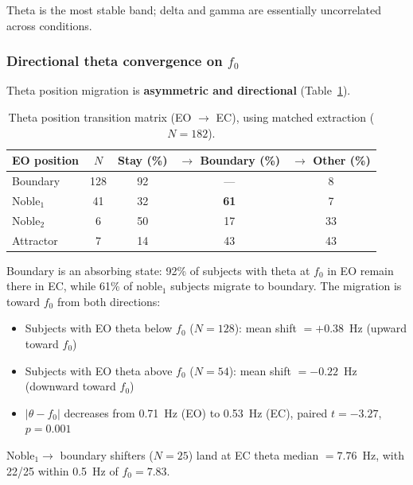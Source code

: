 \documentclass[11pt,a4paper]{article}
\newcommand{\fzero}{f_0}
\begin{document}
Theta is the most stable band; delta and gamma are essentially uncorrelated across conditions.

\subsubsection{Directional theta convergence on $\fzero$}

Theta position migration is \textbf{asymmetric and directional} (Table~\ref{tab:theta_transition}).

\begin{table}[H]
\centering
\caption{Theta position transition matrix (EO $\to$ EC), using matched extraction ($N = 182$).}
\label{tab:theta_transition}
\begin{tabular}{lcccc}
\toprule
EO position & $N$ & Stay (\%) & $\to$ Boundary (\%) & $\to$ Other (\%) \\
\midrule
Boundary & 128 & 92 & --- & 8 \\
Noble$_1$ & 41 & 32 & \textbf{61} & 7 \\
Noble$_2$ & 6 & 50 & 17 & 33 \\
Attractor & 7 & 14 & 43 & 43 \\
\bottomrule
\end{tabular}
\end{table}

Boundary is an absorbing state: 92\% of subjects with theta at $\fzero$ in EO remain there in EC, while 61\% of noble$_1$ subjects migrate to boundary. The migration is toward $\fzero$ from both directions:
\begin{itemize}
    \item Subjects with EO theta below $\fzero$ ($N = 128$): mean shift $= +0.38$~Hz (upward toward $\fzero$)
    \item Subjects with EO theta above $\fzero$ ($N = 54$): mean shift $= -0.22$~Hz (downward toward $\fzero$)
    \item $|\theta - \fzero|$ decreases from 0.71~Hz (EO) to 0.53~Hz (EC), paired $t = -3.27$, $p = 0.001$
\end{itemize}

Noble$_1 \to$ boundary shifters ($N = 25$) land at EC theta median $= 7.76$~Hz, with 22/25 within 0.5~Hz of $\fzero = 7.83$.
\end{document}
